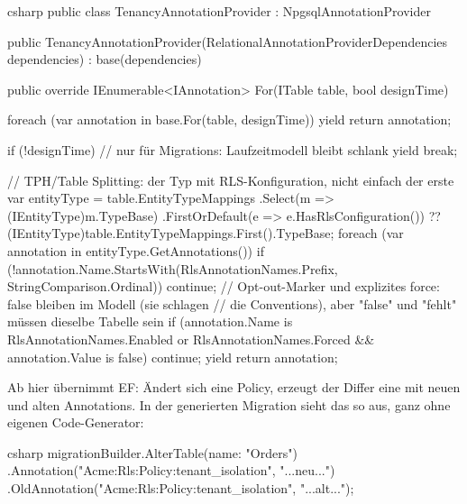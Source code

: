 \begin{sourcecode}{csharp}
public class TenancyAnnotationProvider : NpgsqlAnnotationProvider
{
    public TenancyAnnotationProvider(RelationalAnnotationProviderDependencies dependencies)
        : base(dependencies)
    {
    }

    public override IEnumerable<IAnnotation> For(ITable table, bool designTime)
    {
        foreach (var annotation in base.For(table, designTime))
            yield return annotation;

        if (!designTime)          // nur für Migrations: Laufzeitmodell bleibt schlank
            yield break;

        // TPH/Table Splitting: der Typ mit RLS-Konfiguration, nicht einfach der erste
        var entityType = table.EntityTypeMappings
            .Select(m => (IEntityType)m.TypeBase)
            .FirstOrDefault(e => e.HasRlsConfiguration())
            ?? (IEntityType)table.EntityTypeMappings.First().TypeBase;
        foreach (var annotation in entityType.GetAnnotations())
        {
            if (!annotation.Name.StartsWith(RlsAnnotationNames.Prefix,
                                            StringComparison.Ordinal))
                continue;
            // Opt-out-Marker und explizites force: false bleiben im Modell (sie schlagen
            // die Conventions), aber "false" und "fehlt" müssen dieselbe Tabelle sein
            if (annotation.Name is RlsAnnotationNames.Enabled or RlsAnnotationNames.Forced
                && annotation.Value is false)
                continue;
            yield return annotation;
        }
    }
}
\end{sourcecode}

Ab hier übernimmt EF: Ändert sich eine Policy, erzeugt der Differ eine
 mit neuen und alten Annotations. In der
generierten Migration sieht das so aus, ganz ohne eigenen Code-Generator:

\begin{sourcecode}{csharp}
migrationBuilder.AlterTable(name: "Orders")
    .Annotation("Acme:Rls:Policy:tenant_isolation", "{...neu...}")
    .OldAnnotation("Acme:Rls:Policy:tenant_isolation", "{...alt...}");
\end{sourcecode}


